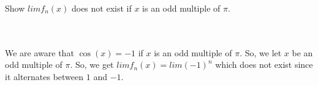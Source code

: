 Show $lim f_n(x)$ does not exist if $x$ is an odd multiple of $\pi$.\\\\

\begin{solution}\renewcommand{\qedsymbol}{}\ \\
    We are aware that $\cos(x)=-1$ if $x$ is an odd multiple of $\pi$. So, we let $x$ be an odd
    multiple of $\pi$. So, we get $lim f_n(x)=lim (-1)^n$ which does not exist since it alternates
    between $1$ and $-1$.

\end{solution}